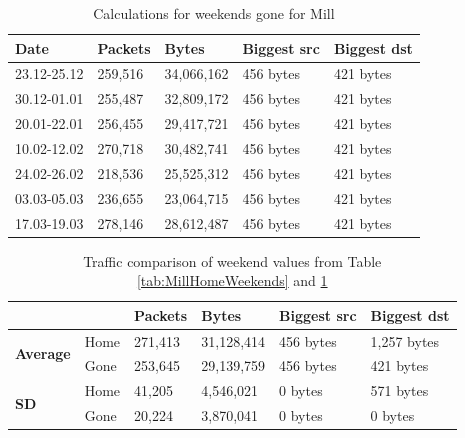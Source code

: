 \begin{table}[H]
    \centering
    \caption{Calculations for weekends gone for Mill}
    \begin{tabular}{|l|l|l|l|l|}
        \hline
        \textbf{Date}    & \textbf{Packets} & \textbf{Bytes} & \textbf{Biggest src} & \textbf{Biggest dst} \\ \hline
        23.12-25.12      & 259,516            & 34,066,162           & 456 bytes            & 421 bytes            \\ \hline
        30.12-01.01      & 255,487            & 32,809,172           & 456 bytes            & 421 bytes            \\ \hline
        20.01-22.01      & 256,455            & 29,417,721           & 456 bytes            & 421 bytes            \\ \hline
        10.02-12.02      & 270,718            & 30,482,741           & 456 bytes            & 421 bytes            \\ \hline
        24.02-26.02      & 218,536            & 25,525,312           & 456 bytes            & 421 bytes            \\ \hline
        03.03-05.03      & 236,655            & 23,064,715           & 456 bytes            & 421 bytes            \\ \hline
        17.03-19.03      & 278,146            & 28,612,487           & 456 bytes            & 421 bytes            \\ \hline
    \end{tabular}
    \label{tab:MillGoneWeekends}
\end{table}

\begin{table}[H]
    \centering
    \caption{Traffic comparison of weekend values from Table \ref{tab:MillHomeWeekends} and \ref{tab:MillGoneWeekends}}
    \begin{tabular}{ll|l|l|l|l|}
        \cline{3-6}
        \textbf{}                                           & \textbf{} & \textbf{Packets} & \textbf{Bytes} & \textbf{Biggest src} & \textbf{Biggest dst} \\ \hline
        \multicolumn{1}{|l|}{\multirow{2}{*}{\textbf{Average}}} & Home      & 271,413          & 31,128,414      & 456 bytes            & 1,257 bytes          \\ \cline{2-6} 
        \multicolumn{1}{|l|}{}                              & Gone      & 253,645          & 29,139,759      & 456 bytes            & 421 bytes            \\ \hline
        \multicolumn{1}{|l|}{\multirow{2}{*}{\textbf{\gls{SD}}}}  & Home      & 41,205           & 4,546,021      & 0 bytes              & 571 bytes            \\ \cline{2-6} 
        \multicolumn{1}{|l|}{}                              & Gone      & 20,224           & 3,870,041       & 0 bytes              & 0 bytes              \\ \hline
    \end{tabular}
    \label{tab:MillWeekends}
\end{table}

